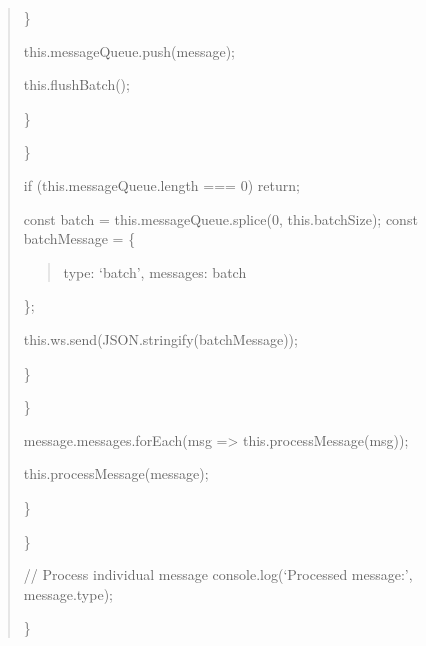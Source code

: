 \documentclass[letterpaper,10pt,english]{sphinxmanual}
\begin{document}
\begin{quote}
\sphinxAtStartPar
\}
\begin{description}
\sphinxAtStartPar
this.messageQueue.push(message);
\begin{description}
\sphinxAtStartPar
this.flushBatch();

\end{description}

\sphinxAtStartPar
\}

\end{description}

\sphinxAtStartPar
\}
\begin{description}
\sphinxAtStartPar
if (this.messageQueue.length === 0) return;

\sphinxAtStartPar
const batch = this.messageQueue.splice(0, this.batchSize);
const batchMessage = \{
\begin{quote}

\sphinxAtStartPar
type: ‘batch’,
messages: batch
\end{quote}

\sphinxAtStartPar
\};
\begin{description}
\sphinxAtStartPar
this.ws.send(JSON.stringify(batchMessage));

\end{description}

\sphinxAtStartPar
\}

\end{description}

\sphinxAtStartPar
\}
\begin{description}
\begin{description}
\sphinxAtStartPar
message.messages.forEach(msg =\textgreater{} this.processMessage(msg));

\sphinxAtStartPar
this.processMessage(message);

\end{description}

\sphinxAtStartPar
\}

\end{description}

\sphinxAtStartPar
\}
\begin{description}
\sphinxAtStartPar
// Process individual message
console.log(‘Processed message:’, message.type);

\end{description}

\sphinxAtStartPar
\}
\end{quote}
\end{document}
